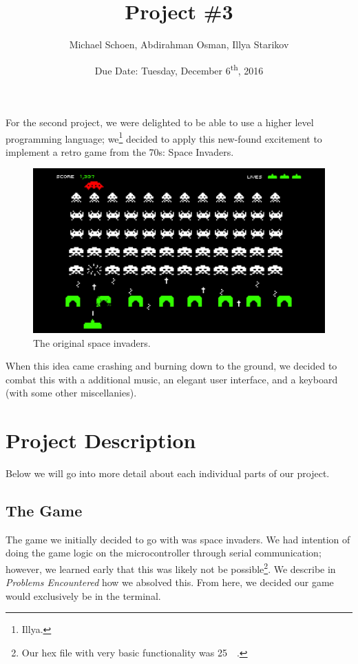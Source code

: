 \documentclass[12pt]{article}
\title{Project \#3}
\date{Due Date: Tuesday, December 6\textsuperscript{th}, 2016}
\author{Michael Schoen, Abdirahman Osman, Illya Starikov}
\begin{document}
\maketitle

For the second project, we were delighted to be able to use a higher level programming language; we\footnote{Illya.} decided to apply this new-found excitement to implement a retro game from the \num{70}s: Space Invaders.

\begin{figure}[!ht]
    \includegraphics[width=\textwidth]{assets/space-invaders.jpg}
    \caption{The original space invaders.}
    \label{space-invaders}
\end{figure}

When this idea came crashing and burning down to the ground, we decided to combat this with a additional music, an elegant user interface, and a keyboard (with some other miscellanies).

\section{Project Description}
Below we will go into more detail about each individual parts of our project.

\subsection{The Game}
The game we initially decided to go with was space invaders. We had intention of doing the game logic on the microcontroller through serial communication; however, we learned early that this was likely not be possible\footnote{Our hex file with very basic functionality was \SI{25}{\kilo\byte}.}. We describe in \textit{Problems Encountered} how we absolved this. From here, we decided our game would exclusively be in the terminal.
\end{document}
